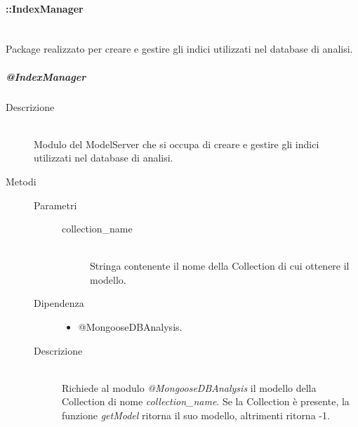 \paragraph{::IndexManager} \hfill \\
Package realizzato per creare e gestire gli indici utilizzati nel database di analisi.
\subparagraph{@IndexManager} \hfill
\begin{description}
 \item[Descrizione] \hfill \\
 Modulo del ModelServer che si occupa di creare e gestire gli indici utilizzati nel database di analisi. 
 \item[Metodi]
  \begin{mldescription}
	\begin{description}
	 \item[Parametri] \hfill
	  \begin{description}
	   \item[collection\_name] \hfill \\
	   Stringa contenente il nome della Collection di cui ottenere il modello.
	  \end{description}
	 \item[Dipendenza] \hfill
	  \begin{itemize}
	   \item @MongooseDBAnalysis.
	  \end{itemize}
	 \item[Descrizione] \hfill \\
	 Richiede al modulo \textit{@MongooseDBAnalysis} il modello della Collection di nome \textit{collection\_name}. Se la Collection è presente, la funzione \textit{getModel} ritorna il suo modello, altrimenti ritorna -1.
	\end{description}	    
    

\end{mldescription}
\end{description}
